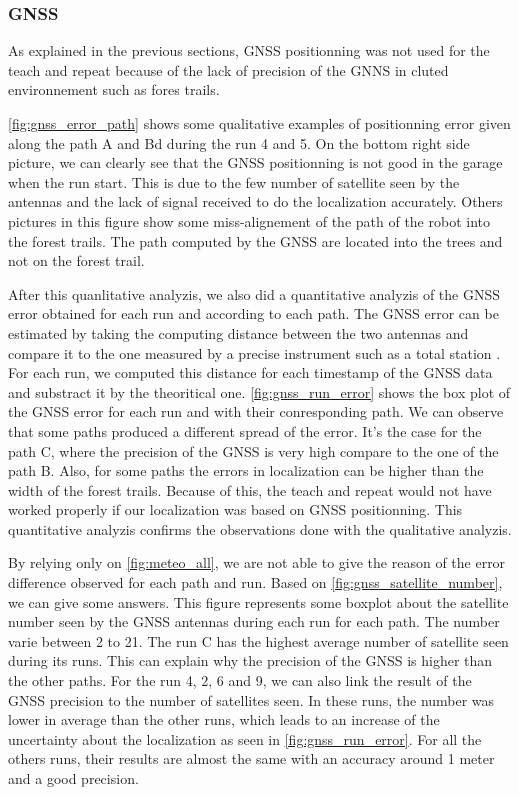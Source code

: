 \subsubsection{GNSS}
\label{sec:res_gnss}

As explained in the previous sections, \ac{GNSS} positionning was not used for the teach and repeat because of the lack of precision of the \ac{GNNS} in cluted environnement such as fores trails.

\autoref{fig:gnss_error_path} shows some qualitative examples of positionning error given along the path A and Bd during the run 4 and 5.
On the bottom right side picture, we can clearly see that the \ac{GNSS} positionning is not good in the garage when the run start. 
This is due to the few number of satellite seen by the antennas and the lack of signal received to do the localization accurately.
Others pictures in this figure show some miss-alignement of the path of the robot into the forest trails.
The path computed by the \ac{GNSS} are located into the trees and not on the forest trail.

After this quanlitative analyzis, we also did a quantitative analyzis of the \ac{GNSS} error obtained for each run and according to each path.
The \ac{GNSS} error can be estimated by taking the computing distance between the two antennas and compare it to the one measured by a precise instrument such as a total station \citep{Vaidis2021}.
For each run, we computed this distance for each timestamp of the \ac{GNSS} data and substract it by the theoritical one.
\autoref{fig:gnss_run_error} shows the box plot of the \ac{GNSS} error for each run and with their conresponding path.
We can observe that some paths produced a different spread of the error.
It's the case for the path C, where the precision of the \ac{GNSS} is very high compare to the one of the path B.
Also, for some paths the errors in localization can be higher than the width of the forest trails.
Because of this, the teach and repeat would not have worked properly if our localization was based on \ac{GNSS} positionning.
This quantitative analyzis confirms the observations done with the qualitative analyzis.

By relying only on \autoref{fig:meteo_all}, we are not able to give the reason of the error difference observed for each path and run.
Based on \autoref{fig:gnss_satellite_number}, we can give some answers.
This figure represents some boxplot about the satellite number seen by the \ac{GNSS} antennas during each run for each path.
The number varie between 2 to 21.
The run C has the highest average number of satellite seen during its runs.
This can explain why the precision of the \ac{GNSS} is higher than the other paths.
For the run 4, 2, 6 and 9, we can also link the result of the \ac{GNSS} precision to the number of satellites seen.
In these runs, the number was lower in average than the other runs, which leads to an increase of the uncertainty about the localization as seen in \autoref{fig:gnss_run_error}.
For all the others runs, their results are almost the same with an accuracy around 1 meter and a good precision.



